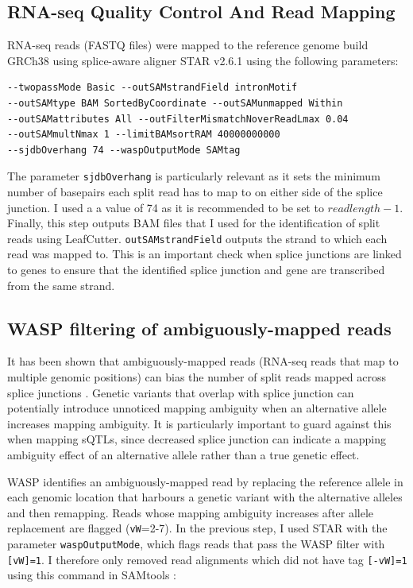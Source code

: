 \subsection{RNA-seq Quality Control And Read Mapping}
RNA-seq reads (FASTQ files) were mapped to the reference genome build GRCh38 using splice-aware aligner STAR v2.6.1 \cite{Dobin2013-hs} using the following parameters: 

\begin{verbatim}
--twopassMode Basic --outSAMstrandField intronMotif
--outSAMtype BAM SortedByCoordinate --outSAMunmapped Within
--outSAMattributes All --outFilterMismatchNoverReadLmax 0.04
--outSAMmultNmax 1 --limitBAMsortRAM 40000000000
--sjdbOverhang 74 --waspOutputMode SAMtag
\end{verbatim}
The parameter \Verb_sjdbOverhang_ is particularly relevant as it sets the minimum number of basepairs each split read has to map to on either side of the splice junction. I used a a value of 74 as it is recommended to be set to $read length -1$. Finally, this step outputs BAM files that I used for the identification of split reads using LeafCutter. \Verb_outSAMstrandField_ outputs the strand to which each read was mapped to. This is an important check when splice junctions are linked to genes to ensure that the identified splice junction and gene are transcribed from the same strand. 

\subsection{WASP filtering of ambiguously-mapped reads}
It has been shown that ambiguously-mapped reads (RNA-seq reads that map to multiple genomic positions) can bias the number of split reads mapped across splice junctions \cite{Van_de_Geijn2015-lb}. Genetic variants that overlap with splice junction can potentially introduce unnoticed mapping ambiguity when an alternative allele increases mapping ambiguity. It is particularly important to guard against this when mapping sQTLs, since decreased splice junction can indicate a mapping ambiguity effect of an alternative allele rather than a true genetic effect.

WASP \cite{Van_de_Geijn2015-lb} identifies an ambiguously-mapped read by replacing the reference allele in each genomic location that harbours a genetic variant with the alternative alleles and then remapping. Reads whose mapping ambiguity increases after allele replacement are flagged (\Verb_vW_=2-7). In the previous step, I used STAR with the parameter \Verb_waspOutputMode_, which flags reads that pass the WASP filter with \Verb_[vW]=1_.  I therefore only removed read alignments which did not have tag \Verb_[-vW]=1_ using this command in SAMtools \cite{Li2009-yk}:


